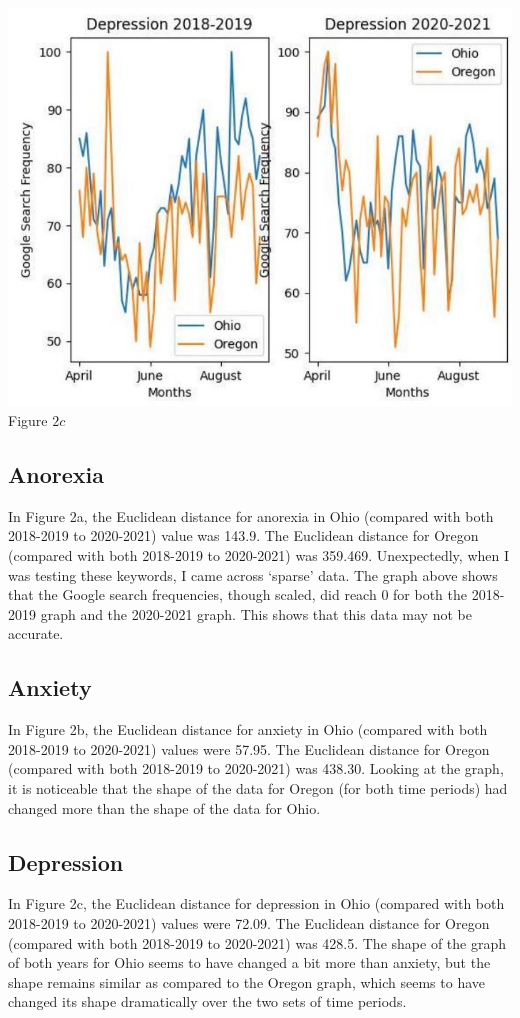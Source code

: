 \documentclass{article}
\begin{document}
\begin{center}
\includegraphics[scale=0.5]{2023_08_04_7b2b5ae1fb9d756e7758g-5}
\\ Figure $2 c$
\end{center}

\subsection{Anorexia}
In Figure 2a, the Euclidean distance for anorexia in Ohio (compared with both 2018-2019 to
2020-2021) value was 143.9. The Euclidean distance for Oregon (compared with both 2018-2019 to
2020-2021) was 359.469. Unexpectedly, when I was testing these keywords, I came across ‘sparse’
data. The graph above shows that the Google search frequencies, though scaled, did reach 0 for both
the 2018-2019 graph and the 2020-2021 graph. This shows that this data may not be accurate.

\subsection{Anxiety}
In Figure 2b, the Euclidean distance for anxiety in Ohio (compared with both 2018-2019 to 2020-2021)
values were 57.95. The Euclidean distance for Oregon (compared with both 2018-2019 to 2020-2021)
was 438.30. Looking at the graph, it is noticeable that the shape of the data for Oregon (for both time
periods) had changed more than the shape of the data for Ohio.

\subsection{Depression}
In Figure 2c, the Euclidean distance for depression in Ohio (compared with both 2018-2019 to
2020-2021) values were 72.09. The Euclidean distance for Oregon (compared with both 2018-2019 to
2020-2021) was 428.5. The shape of the graph of both years for Ohio seems to have changed a bit
more than anxiety, but the shape remains similar as compared to the Oregon graph, which seems to have
changed its shape dramatically over the two sets of time periods.
\end{document}
